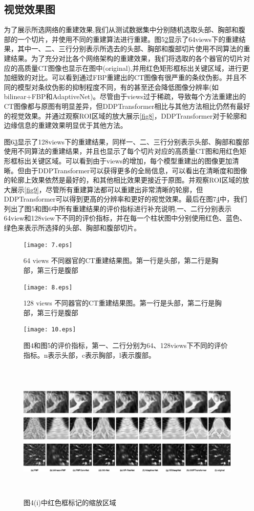 \subsection{视觉效果图}
为了展示所选网络的重建效果,我们从测试数据集中分别随机选取头部、胸部和腹部的一个切片，并使用不同的重建算法进行重建。图5\ref{fig5}显示了64views下的重建结果，其中一、二、三行分别表示所选去的头部、胸部和腹部切片使用不同算法的重建结果。为了充分对比各个网络架构的重建效果，我们将选取的各个器官的切片对应的高质量CT图像也显示在图中(original),并用红色矩形框标出关键区域，进行更加细致的对比。可以看到通过FBP重建出的CT图像有很严重的条纹伪影。并且不同的模型对条纹伪影的抑制程度不同，有的甚至还会降低图像分辨率(如bilinear+FBP和AdaptiveNet)。尽管由于views过于稀疏，导致每个方法重建出的CT图像都与原图有明显差异，但DDPTransformer相比与其他方法相比仍然有最好的视觉效果。并通过观察ROI区域的放大展示\ref{fig8}，DDPTransformer对于轮廓和边缘信息的重建效果明显优于其他方法。\par
图6\ref{fig6}显示了128views下的重建结果，同样一、二、三行分别表示头部、胸部和腹部使用不同算法的重建结果，并且也显示了每个切片对应的高质量CT图和用红色矩形框标出关键区域。可以看到由于views的增加，每个模型重建出的图像更加清晰。但由于DDPTransformer可以获得更多的全局信息，可以看出在清晰度和图像的轮廓上效果依然是最好的，和其他相比效果更接近于原图。并观察ROI区域的放大展示\ref{fig9}，尽管所有重建算法都可以重建出非常清晰的轮廓，但DDPTransformer可以得到更高的分辨率和更好的视觉效果。最后在图7\ref{fig7}中，我们列出了图5和图6中所有重建结果的评价指标进行补充说明,一、二行分别表示64view和128view下不同的评价指标，并在每一个柱状图中分别使用红色、蓝色、绿色来表示所选择的头部、胸部和腹部切片。\par
\begin{figure}
	\centering
	\texttt{[image: 7.eps]}
	\caption{64 views 不同器官的CT重建结果图。第一行是头部，第二行是胸部，第三行是腹部}
	\label{fig4}
\end{figure}
\begin{figure}
	\centering
	\texttt{[image: 8.eps]}
	\caption{128 views 不同器官的CT重建结果图。第一行是头部，第二行是胸部，第三行是腹部}
	\label{fig5}
\end{figure}
\begin{figure}
	\centering
	\texttt{[image: 10.eps]}
	\caption{图4和图5的评价指标，第一、二行分别为64、128views下不同的评价指标。n表示头部，c表示胸部，l表示腹部。}
	\label{fig6}
\end{figure}
\begin{figure}
	\centering
	\includegraphics[height=7cm,width=18cm]{14.eps}
	\caption{图4(i)中红色框标记的缩放区域}
	\label{fig7}
\end{figure}
